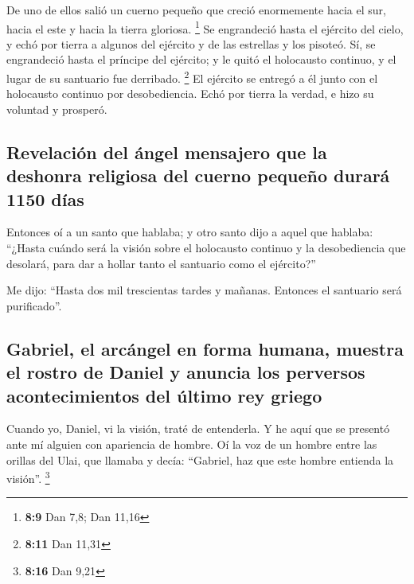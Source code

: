 \begin{paracol}{2}
 De uno de ellos salió un cuerno pequeño que creció
enormemente hacia el sur, hacia el este y hacia la tierra gloriosa.
\footnote{\textbf{8:9} Dan 7,8; Dan 11,16}  Se
engrandeció hasta el ejército del cielo, y echó por tierra a algunos del
ejército y de las estrellas y los pisoteó.  Sí, se
engrandeció hasta el príncipe del ejército; y le quitó el holocausto
continuo, y el lugar de su santuario fue derribado. \footnote{\textbf{8:11}
  Dan 11,31}  El ejército se entregó a él junto con el
holocausto continuo por desobediencia. Echó por tierra la verdad, e hizo
su voluntad y prosperó.

\hypertarget{revelaciuxf3n-del-uxe1ngel-mensajero-que-la-deshonra-religiosa-del-cuerno-pequeuxf1o-duraruxe1-1150-duxedas}{%
\subsection{Revelación del ángel mensajero que la deshonra religiosa del
cuerno pequeño durará 1150
días}\label{revelaciuxf3n-del-uxe1ngel-mensajero-que-la-deshonra-religiosa-del-cuerno-pequeuxf1o-duraruxe1-1150-duxedas}}

 Entonces oí a un santo que hablaba; y otro santo dijo a
aquel que hablaba: ``¿Hasta cuándo será la visión sobre el holocausto
continuo y la desobediencia que desolará, para dar a hollar tanto el
santuario como el ejército?''

 Me dijo: ``Hasta dos mil trescientas tardes y mañanas.
Entonces el santuario será purificado''.

\hypertarget{gabriel-el-arcuxe1ngel-en-forma-humana-muestra-el-rostro-de-daniel-y-anuncia-los-perversos-acontecimientos-del-uxfaltimo-rey-griego}{%
\subsection{Gabriel, el arcángel en forma humana, muestra el rostro de
Daniel y anuncia los perversos acontecimientos del último rey
griego}\label{gabriel-el-arcuxe1ngel-en-forma-humana-muestra-el-rostro-de-daniel-y-anuncia-los-perversos-acontecimientos-del-uxfaltimo-rey-griego}}

 Cuando yo, Daniel, vi la visión, traté de entenderla. Y
he aquí que se presentó ante mí alguien con apariencia de hombre.
 Oí la voz de un hombre entre las orillas del Ulai, que
llamaba y decía: ``Gabriel, haz que este hombre entienda la visión''.
\footnote{\textbf{8:16} Dan 9,21}


\end{paracol}
